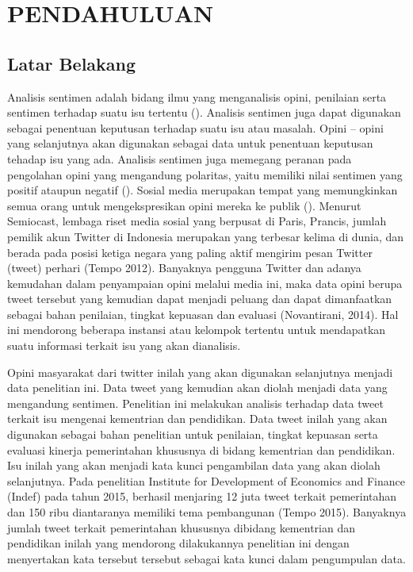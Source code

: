 \section*{PENDAHULUAN} %
\subsection*{Latar Belakang}

Analisis sentimen adalah bidang ilmu yang menganalisis opini, penilaian serta sentimen terhadap suatu isu tertentu (\cite{LIU2012}). Analisis sentimen juga dapat digunakan sebagai penentuan keputusan terhadap suatu isu atau masalah. Opini – opini yang selanjutnya akan digunakan sebagai data untuk penentuan keputusan tehadap isu yang ada. Analisis sentimen juga memegang peranan pada pengolahan opini yang mengandung polaritas, yaitu memiliki nilai sentimen yang positif ataupun negatif (\cite{Novantirani2014}). Sosial media merupakan tempat yang memungkinkan semua orang untuk mengekspresikan opini mereka ke publik (\cite{LIU2012}). Menurut Semiocast, lembaga riset media sosial yang berpusat di Paris, Prancis, jumlah pemilik akun Twitter di Indonesia merupakan yang terbesar kelima di dunia, dan berada pada posisi ketiga negara yang paling aktif mengirim pesan Twitter (tweet) perhari (Tempo 2012). Banyaknya pengguna Twitter dan adanya kemudahan dalam penyampaian opini melalui media ini, maka data opini berupa tweet tersebut yang kemudian dapat menjadi peluang dan dapat dimanfaatkan sebagai bahan penilaian, tingkat kepuasan dan evaluasi (Novantirani, 2014). Hal ini mendorong beberapa instansi atau kelompok tertentu untuk mendapatkan suatu informasi terkait isu yang akan dianalisis. 

Opini masyarakat dari twitter inilah yang akan digunakan selanjutnya menjadi data penelitian ini. Data tweet yang kemudian akan diolah menjadi data yang mengandung sentimen. Penelitian ini melakukan analisis terhadap data tweet terkait isu mengenai kementrian dan pendidikan. Data tweet inilah yang akan digunakan sebagai bahan penelitian untuk penilaian, tingkat kepuasan serta evaluasi kinerja pemerintahan khususnya di bidang kementrian dan pendidikan. Isu inilah yang akan menjadi kata kunci pengambilan data yang akan diolah selanjutnya. Pada penelitian Institute for Development of Economics and Finance (Indef) pada tahun 2015, berhasil menjaring 12 juta tweet terkait pemerintahan dan 150 ribu diantaranya memiliki tema pembangunan (Tempo 2015). Banyaknya jumlah tweet terkait pemerintahan khususnya dibidang kementrian dan pendidikan inilah yang mendorong dilakukannya penelitian ini dengan menyertakan kata tersebut tersebut sebagai kata kunci dalam pengumpulan data. 


